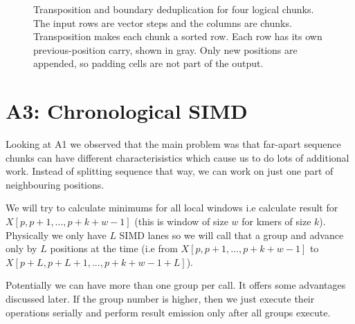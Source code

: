 \begin{figure}[H]
\caption{Transposition and boundary deduplication for four logical chunks.
The input rows are vector steps and the columns are chunks. Transposition
makes each chunk a sorted row. Each row has its own previous-position carry,
shown in gray. Only new positions are appended, so padding cells are not part
of the output.}
\label{fig:transpose-dedup}
\end{figure}

\section{A3: Chronological SIMD}
\label{sec:rewrite-v8}

Looking at A1 we observed that the main problem was that far-apart sequence chunks can have different characterisistics which cause us to do lots of additional work. Instead of splitting sequence that way, we can work on just one part of neighbouring positions.

We will try to calculate minimums for all local windows i.e calculate result for $X[p, p+1, ..., p+k+w-1]$ (this is window of size $w$ for kmers of size $k$).
Physically we only have $L$ SIMD lanes so we will call that a group and advance only by $L$ positions at the time (i.e from $X[p, p+1, ..., p+k+w-1]$ to $X[p+L, p+L+1, ..., p+k+w-1+L]$).

Potentially we can have more than one group per call. It offers some advantages discussed later. If the group number is higher, then we just execute their operations serially and perform result emission only after all groups execute.

